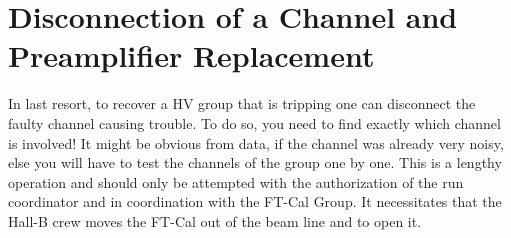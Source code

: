 \documentclass[12pt]{article}
\begin{document}
\section{Disconnection of a Channel and Preamplifier Replacement}
     
 In last resort, to recover a HV group that is tripping one can disconnect the faulty channel causing trouble. To do so, you need to find exactly which channel is involved! It might be obvious from data, if the channel was already very noisy, else you will have to test the channels of the group one by one. This is a lengthy operation and should only be attempted with the authorization of the run coordinator and in coordination with the FT-Cal Group. It necessitates that the Hall-B crew moves the FT-Cal out of the beam line and to open it.
\end{document}
